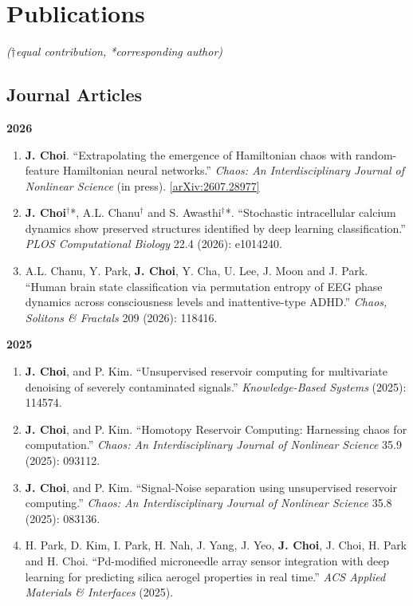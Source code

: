 \documentclass[11pt,a4paper]{article}
\begin{document}
\section*{Publications}
\textit{($\dagger$equal contribution, *corresponding author)}

\subsection*{Journal Articles}

\textbf{2026}

\begin{enumerate}[leftmargin=1.5em, topsep=0.2em, itemsep=0.3em]
    \item \textbf{J. Choi}. ``Extrapolating the emergence of Hamiltonian chaos with random-feature Hamiltonian neural networks.'' \textit{Chaos: An Interdisciplinary Journal of Nonlinear Science} (in press). \href{https://arxiv.org/abs/2607.28977}{[arXiv:2607.28977]}
    
    \item \textbf{J. Choi}$^\dagger$*, A.L. Chanu$^\dagger$ and S. Awasthi$^\dagger$*. ``Stochastic intracellular calcium dynamics show preserved structures identified by deep learning classification.'' \textit{PLOS Computational Biology} 22.4 (2026): e1014240.
    
    \item A.L. Chanu, Y. Park, \textbf{J. Choi}, Y. Cha, U. Lee, J. Moon and J. Park. ``Human brain state classification via permutation entropy of EEG phase dynamics across consciousness levels and inattentive-type ADHD.'' \textit{Chaos, Solitons \& Fractals} 209 (2026): 118416.
\end{enumerate}

\textbf{2025}

\begin{enumerate}[leftmargin=1.5em, topsep=0.2em, itemsep=0.3em, resume]
    \item \textbf{J. Choi}, and P. Kim. ``Unsupervised reservoir computing for multivariate denoising of severely contaminated signals.'' \textit{Knowledge-Based Systems} (2025): 114574.
    
    \item \textbf{J. Choi}, and P. Kim. ``Homotopy Reservoir Computing: Harnessing chaos for computation.'' \textit{Chaos: An Interdisciplinary Journal of Nonlinear Science} 35.9 (2025): 093112.
    
    \item \textbf{J. Choi}, and P. Kim. ``Signal-Noise separation using unsupervised reservoir computing.'' \textit{Chaos: An Interdisciplinary Journal of Nonlinear Science} 35.8 (2025): 083136.
    
    \item H. Park, D. Kim, I. Park, H. Nah, J. Yang, J. Yeo, \textbf{J. Choi}, J. Choi, H. Park and H. Choi. ``Pd-modified microneedle array sensor integration with deep learning for predicting silica aerogel properties in real time.'' \textit{ACS Applied Materials \& Interfaces} (2025).
\end{enumerate}
\end{document}
